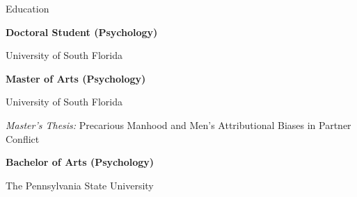 \begin{rubric}{Education}

\textbf{Doctoral Student (Psychology)} \par University of South Florida

\entry*[July 2012] 
\textbf{Master of Arts (Psychology)} \par University of South Florida \par \par \textit{Master's Thesis:} Precarious Manhood and Men’s Attributional Biases in Partner Conflict

\entry*[May 2009] 
\textbf{Bachelor of Arts (Psychology)} \par The Pennsylvania State University

\end{rubric}
